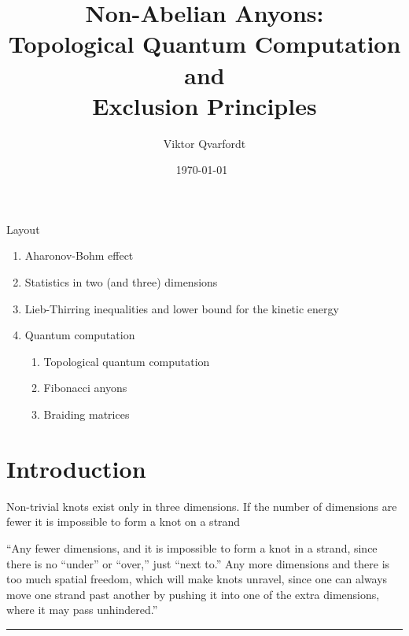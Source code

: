 \documentclass[a4paper,10pt,oneside]{book}
\theoremstyle{plain}
\theoremstyle{definition}
\theoremstyle{remark}
\begin{document}
\title{Non-Abelian Anyons:\\Topological Quantum Computation and\\Exclusion Principles}
\author{Viktor Qvarfordt}
\date{\isodate\today\ \currenttime}
\maketitle
\tableofcontents
\newpage








Layout

\begin{enumerate}
  \item Aharonov-Bohm effect
  \item Statistics in two (and three) dimensions
  \item Lieb-Thirring inequalities and lower bound for the kinetic energy
  \item Quantum computation
  \begin{enumerate}
    \item Topological quantum computation
    \item Fibonacci anyons
    \item Braiding matrices
  \end{enumerate}
\end{enumerate}

\chapter{Introduction}

{ %
Non-trivial knots exist only in three dimensions. If the number of dimensions are fewer it is impossible to form a knot on a strand

``Any fewer dimensions, and it is impossible to form a knot in a strand, since there is no “under” or “over,” just “next to.” Any more dimensions and there is too much spatial freedom, which will make knots unravel, since one can always move one strand past another by pushing it into one of the extra dimensions, where it may pass unhindered.''
}

\vspace{0.5cm}
\hrule
\vspace{0.5cm}
\end{document}
